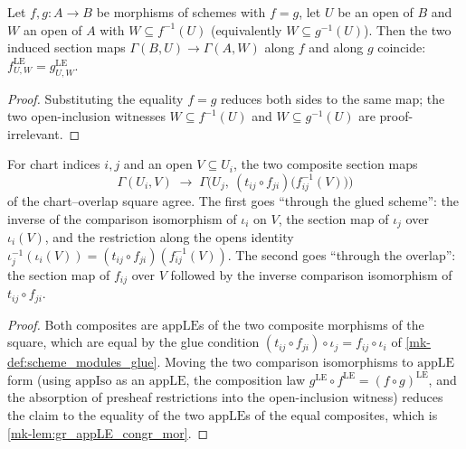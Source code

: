 \begin{lemma}\label{mk-lem:gr_appLE_congr_mor}
  \leanok

  Let \(f, g : A \to B\) be morphisms of schemes with \(f = g\), let \(U\) be an open of
  \(B\) and \(W\) an open of \(A\) with \(W \subseteq f^{-1}(U)\) (equivalently
  \(W \subseteq g^{-1}(U)\)). Then the two induced section maps
  \(\Gamma(B, U) \to \Gamma(A, W)\) along \(f\) and along \(g\) coincide:
  \(f^{\mathrm{LE}}_{U,W} = g^{\mathrm{LE}}_{U,W}\).
\end{lemma}
\begin{proof}
  \leanok

Substituting the equality \(f = g\) reduces both sides to the same map; the two
  open-inclusion witnesses \(W \subseteq f^{-1}(U)\) and \(W \subseteq g^{-1}(U)\) are
  proof-irrelevant.
\end{proof}

\begin{lemma}\label{mk-lem:gr_overlap_appIso_compat}
  \leanok

  For chart indices \(i, j\) and an open \(V \subseteq U_i\), the two composite
  section maps
  \[
    \Gamma(U_i, V)\;\longrightarrow\;
      \Gamma\bigl(U_j,\ (t_{ij}\circ f_{ji})\bigl(f_{ij}^{-1}(V)\bigr)\bigr)
  \]
  of the chart--overlap square agree. The first goes ``through the glued scheme'':
  the inverse of the comparison isomorphism of \(\iota_i\) on \(V\), the section map of
  \(\iota_j\) over \(\iota_i(V)\), and the restriction along the opens identity
  \(\iota_j^{-1}(\iota_i(V)) = (t_{ij}\circ f_{ji})(f_{ij}^{-1}(V))\). The second goes
  ``through the overlap'': the section map of \(f_{ij}\) over \(V\) followed by the
  inverse comparison isomorphism of \(t_{ij}\circ f_{ji}\).
\end{lemma}
\begin{proof}
  \leanok
  Both composites are \(\mathrm{appLE}\)s of the two composite morphisms of the square,
  which are equal by the glue condition \((t_{ij}\circ f_{ji})\circ \iota_j =
  f_{ij}\circ \iota_i\) of \ref{mk-def:scheme_modules_glue}. Moving the two comparison
  isomorphisms to \(\mathrm{appLE}\) form (using \(\mathrm{appIso}\) as an
  \(\mathrm{appLE}\), the composition law \(g^{\mathrm{LE}}\circ f^{\mathrm{LE}} =
  (f\circ g)^{\mathrm{LE}}\), and the absorption of presheaf restrictions into the
  open-inclusion witness) reduces the claim to the equality of the two
  \(\mathrm{appLE}\)s of the equal composites, which is \ref{mk-lem:gr_appLE_congr_mor}.
\end{proof}

